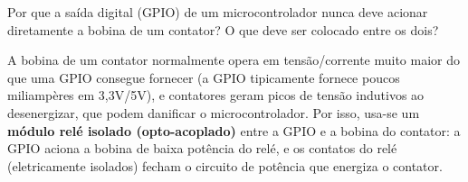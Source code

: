 \question[3] Por que a saída digital (GPIO) de um microcontrolador nunca deve acionar diretamente a bobina de um contator? O que deve ser colocado entre os dois?

\begin{solution}
A bobina de um contator normalmente opera em tensão/corrente muito maior do que uma GPIO consegue fornecer (a GPIO tipicamente fornece poucos miliampères em 3,3V/5V), e contatores geram picos de tensão indutivos ao desenergizar, que podem danificar o microcontrolador. Por isso, usa-se um \textbf{módulo relé isolado (opto-acoplado)} entre a GPIO e a bobina do contator: a GPIO aciona a bobina de baixa potência do relé, e os contatos do relé (eletricamente isolados) fecham o circuito de potência que energiza o contator.
\end{solution}
